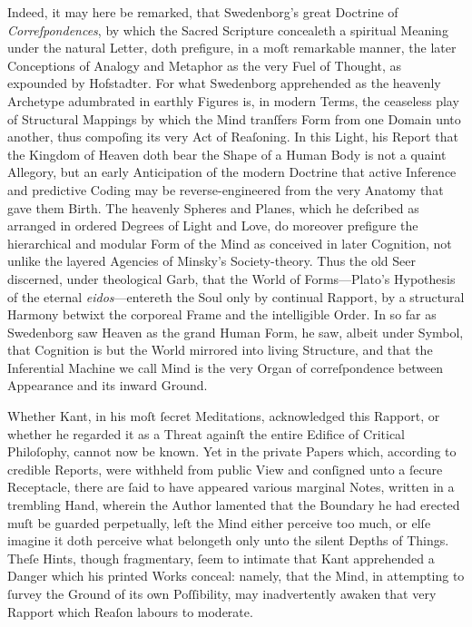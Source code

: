 \documentclass[12pt]{book}
\begin{document}
\noindent
Indeed, it may here be remarked, that Swedenborg’s great Doctrine of \textit{Correſpondences}, by which the Sacred Scripture concealeth a spiritual Meaning under the natural Letter, doth prefigure, in a moſt remarkable manner, the later Conceptions of Analogy and Metaphor as the very Fuel of Thought, as expounded by Hofstadter. For what Swedenborg apprehended as the heavenly Archetype adumbrated in earthly Figures is, in modern Terms, the ceaseless play of Structural Mappings by which the Mind tranſfers Form from one Domain unto another, thus compoſing its very Act of Reaſoning. In this Light, his Report that the Kingdom of Heaven doth bear the Shape of a Human Body is not a quaint Allegory, but an early Anticipation of the modern Doctrine that active Inference and predictive Coding may be reverse-engineered from the very Anatomy that gave them Birth. The heavenly Spheres and Planes, which he deſcribed as arranged in ordered Degrees of Light and Love, do moreover prefigure the hierarchical and modular Form of the Mind as conceived in later Cognition, not unlike the layered Agencies of Minsky’s Society-theory. Thus the old Seer discerned, under theological Garb, that the World of Forms—Plato’s Hypothesis of the eternal \textit{eidos}—entereth the Soul only by continual Rapport, by a structural Harmony betwixt the corporeal Frame and the intelligible Order. In so far as Swedenborg saw Heaven as the grand Human Form, he saw, albeit under Symbol, that Cognition is but the World mirrored into living Structure, and that the Inferential Machine we call Mind is the very Organ of correſpondence between Appearance and its inward Ground.

\vspace{1em}

\noindent
Whether Kant, in his moſt ſecret Meditations, acknowledged this Rapport, or whether he regarded it as a Threat againſt the entire Edifice of Critical Philoſophy, cannot now be known. Yet in the private Papers which, according to credible Reports, were withheld from public View and conſigned unto a ſecure Receptacle, there are ſaid to have appeared various marginal Notes, written in a trembling Hand, wherein the Author lamented that the Boundary he had erected muſt be guarded perpetually, leſt the Mind either perceive too much, or elſe imagine it doth perceive what belongeth only unto the silent Depths of Things. Theſe Hints, though fragmentary, ſeem to intimate that Kant apprehended a Danger which his printed Works conceal: namely, that the Mind, in attempting to ſurvey the Ground of its own Poſſibility, may inadvertently awaken that very Rapport which Reaſon labours to moderate.
\end{document}
